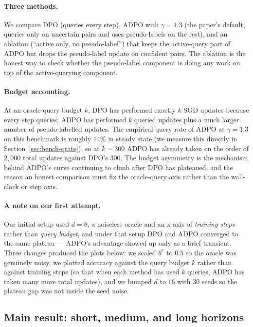 \documentclass[11pt]{article}
\begin{document}
\paragraph{Three methods.}
We compare DPO (queries every step), ADPO with $\gamma = 1.3$ (the paper's default, queries only on uncertain pairs and uses pseudo-labels on the rest), and an ablation (``active only, no pseudo-label'') that keeps the active-query part of ADPO but drops the pseudo-label update on confident pairs. The ablation is the honest way to check whether the pseudo-label component is doing any work on top of the active-querying component.

\paragraph{Budget accounting.}
At an oracle-query budget $k$, DPO has performed exactly $k$ SGD updates because every step queries; ADPO has performed $k$ queried updates plus a much larger number of pseudo-labelled updates. The empirical query rate of ADPO at $\gamma = 1.3$ on this benchmark is roughly $14\%$ in steady state (we measure this directly in Section~\ref{sec:bench-qrate}), so at $k = 300$ ADPO has already taken on the order of $2{,}000$ total updates against DPO's $300$. The budget asymmetry is the mechanism behind ADPO's curve continuing to climb after DPO has plateaued, and the reason an honest comparison must fix the oracle-query axis rather than the wall-clock or step axis.

\paragraph{A note on our first attempt.}
Our initial setup used $d = 8$, a noiseless oracle and an x-axis of \emph{training steps} rather than \emph{query budget}, and under that setup DPO and ADPO converged to the same plateau --- ADPO's advantage showed up only as a brief transient. Three changes produced the plots below: we scaled $\theta^*$ to $0.5$ so the oracle was genuinely noisy, we plotted accuracy against the query budget $k$ rather than against training steps (so that when each method has used $k$ queries, ADPO has taken many more total updates), and we bumped $d$ to $16$ with 30 seeds so the plateau gap was not inside the seed noise.

\subsection{Main result: short, medium, and long horizons}
\end{document}
